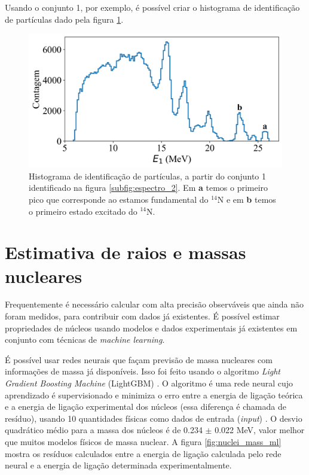 \documentclass[a4paper,12pt,oneside]{book}
\begin{document}
\begin{appendices}
\par Usando o conjunto 1, por exemplo, é possível criar o histograma de identificação de partículas dado pela figura \ref{fig:PID_hist}.

\begin{figure}[H]
    \centering
    \includegraphics[scale=0.11]{figs/espectro_3.png}
    \caption{Histograma de identificação de partículas, a partir do conjunto 1 identificado na figura \ref{subfig:espectro_2}. Em \textbf{a} temos o primeiro pico que corresponde ao estamos fundamental do $^{14}$N e em \textbf{b} temos o primeiro estado excitado do $^{14}$N.}
    \label{fig:PID_hist}
\end{figure}

\section{Estimativa de raios e massas nucleares}

\par Frequentemente é necessário calcular com alta precisão observáveis que ainda não foram medidos, para contribuir com dados já existentes. É possível estimar propriedades de núcleos usando modelos e dados experimentais já existentes em conjunto com técnicas de \textit{machine learning}.

\par É possível usar redes neurais que façam previsão de massa nucleares com informações de massa já disponíveis. Isso foi feito usando o algoritmo \textit{Light Gradient Boosting Machine} (LightGBM) \cite{LightGBM}. O algoritmo é uma rede neural cujo aprendizado é supervisionado e minimiza o erro entre a energia de ligação teórica e a energia de ligação experimental dos núcleos (essa diferença é chamada de resíduo), usando 10 quantidades físicas como dados de entrada (\textit{input}) \cite{nuclear_mass}. O desvio quadrático médio para a massa dos núcleos é de 0.234 $\pm$ 0.022 MeV, valor melhor que muitos modelos físicos de massa nuclear. A figura \ref{fig:nuclei_mass_ml} mostra os resíduos calculados entre a energia de ligação calculada pelo rede neural e a energia de ligação determinada experimentalmente.


\end{appendices}
\end{document}
